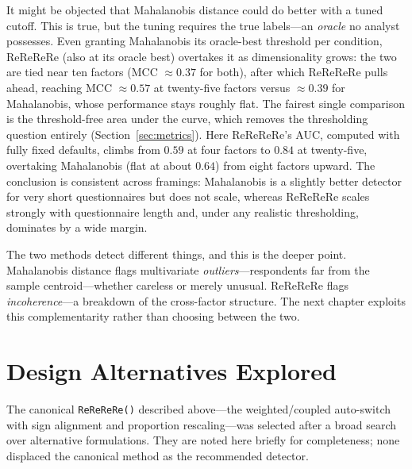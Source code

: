 It might be objected that Mahalanobis distance could do better with a tuned
cutoff. This is true, but the tuning requires the true labels---an
\emph{oracle} no analyst possesses. Even granting Mahalanobis its oracle-best
threshold per condition, ReReReRe (also at its oracle best) overtakes it as
dimensionality grows: the two are tied near ten factors (MCC $\approx 0.37$ for
both), after which ReReReRe pulls ahead, reaching MCC $\approx 0.57$ at
twenty-five factors versus $\approx 0.39$ for Mahalanobis, whose performance
stays roughly flat. The fairest single comparison is the threshold-free area
under the curve, which removes the thresholding question entirely
(Section~\ref{sec:metrics}). Here ReReReRe's AUC, computed with fully fixed defaults, climbs
from $0.59$ at four factors to $0.84$ at twenty-five, overtaking Mahalanobis
(flat at about $0.64$) from eight factors upward. The conclusion is consistent
across framings: Mahalanobis is a slightly better detector for very short
questionnaires but does not scale, whereas ReReReRe scales strongly with
questionnaire length and, under any realistic thresholding, dominates by a wide
margin.

The two methods detect different things, and this is the deeper point.
Mahalanobis distance flags multivariate \emph{outliers}---respondents far from
the sample centroid---whether careless or merely unusual. ReReReRe flags
\emph{incoherence}---a breakdown of the cross-factor structure. The next
chapter exploits this complementarity rather than choosing between the two.

\section{Design Alternatives Explored}

The canonical \texttt{ReReReRe()} described above---the weighted/coupled
auto-switch with sign alignment and proportion rescaling---was selected after a
broad search over alternative formulations. They are noted here briefly for
completeness; none displaced the canonical method as the recommended detector.

